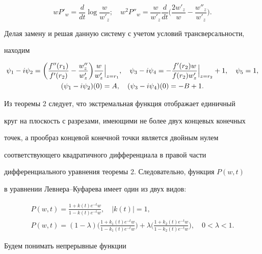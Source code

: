 $$


wP'_w=\frac d{dt}\log\frac w{w'_z};\quad


w^2P''_{w}=\frac w{w'_z}\frac d{dt} \biggl(\frac {2w'_z}{w} -


\frac {w''_{z}}{w'_z}\biggr).


$$


Делая замену и решая данную систему с учетом условий трансверсальности,


находим


\begin{gather}


\psi_1-i\psi_2=\biggl(\frac{f''(r_1)}{f'(r_2)}-\frac {w''_{z}}{w'_z}


\biggr)\frac w{w'_z}\Big|_{z=r_1},\quad


\psi_3-i\psi_4 =- \frac {f'(r_2)w}{f(r_2)w'_z}\Big|_{z=r_2} + 1,


\quad \psi_5=1, \notag \\


%


(\psi_1-i\psi_2)(0) = A,\quad (\psi_3-i\psi_4)(0) =-B + 1.


\end{gather}


Из теоремы 2 следует, что экстремальная функция отображает единичный


круг на плоскость с разрезами, имеющими не более двух концевых конечных


точек, а прообраз концевой конечной точки является двойным нулем


соответствующего квадратичного дифференциала в правой части


дифференциального уравнения теоремы 2. Следовательно, функция $P(w,t)$


в уравнении Левнера--Куфарева имеет один из двух видов:


\begin{gather}


P(w,t)=\frac {1 + k(t)e^{-t}w}{1-k(t)e^{-t}w},\quad |k(t)|=1, \\


%


P(w,t)=(1- \lambda)\biggl(\frac {1 + k_1(t)e^{-t}w}{1-k_1(t)e^{-t}w}


\biggr)+\lambda\biggl(\frac{1+k_2(t)e^{-t}w}{1-k_2(t)e^{-t}w}\biggr),


\quad 0 < \lambda < 1.


\end{gather}


Будем понимать непрерывные функции


